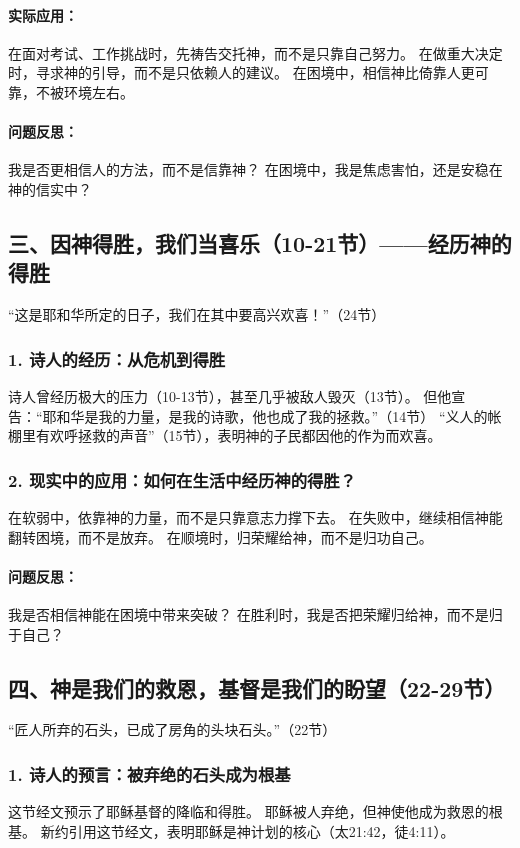 \documentclass[a4paper, 12pt]{article}
\begin{document}
\paragraph*{实际应用：}

在面对考试、工作挑战时，先祷告交托神，而不是只靠自己努力。
在做重大决定时，寻求神的引导，而不是只依赖人的建议。
在困境中，相信神比倚靠人更可靠，不被环境左右。
\paragraph*{问题反思：}

我是否更相信人的方法，而不是信靠神？
在困境中，我是焦虑害怕，还是安稳在神的信实中？
\subsection*{三、因神得胜，我们当喜乐（10-21节）——经历神的得胜}
“这是耶和华所定的日子，我们在其中要高兴欢喜！”（24节）

\subsubsection*{1. 诗人的经历：从危机到得胜}
诗人曾经历极大的压力（10-13节），甚至几乎被敌人毁灭（13节）。
但他宣告：“耶和华是我的力量，是我的诗歌，他也成了我的拯救。”（14节）
“义人的帐棚里有欢呼拯救的声音”（15节），表明神的子民都因他的作为而欢喜。
\subsubsection*{2. 现实中的应用：如何在生活中经历神的得胜？}
在软弱中，依靠神的力量，而不是只靠意志力撑下去。
在失败中，继续相信神能翻转困境，而不是放弃。
在顺境时，归荣耀给神，而不是归功自己。
\paragraph*{问题反思：}

我是否相信神能在困境中带来突破？
在胜利时，我是否把荣耀归给神，而不是归于自己？
\subsection*{四、神是我们的救恩，基督是我们的盼望（22-29节）}
“匠人所弃的石头，已成了房角的头块石头。”（22节）

\subsubsection*{1. 诗人的预言：被弃绝的石头成为根基}
这节经文预示了耶稣基督的降临和得胜。
耶稣被人弃绝，但神使他成为救恩的根基。
新约引用这节经文，表明耶稣是神计划的核心（太21:42，徒4:11）。
\end{document}
